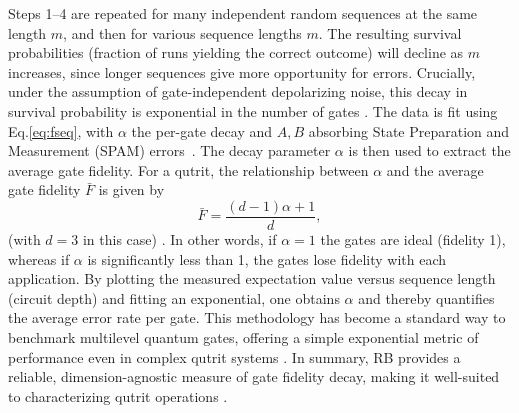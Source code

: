 Steps 1–4 are repeated for many independent random sequences at the same length $m$, and then for various sequence lengths $m$. The resulting survival probabilities (fraction of runs yielding the correct outcome) will decline as $m$ increases, since longer sequences give more opportunity for errors. Crucially, under the assumption of gate-independent depolarizing noise, this decay in survival probability is exponential in the number of gates \cite{Magesan2011PRL}. The data is fit using Eq.\eqref{eq:fseq}, with $\alpha$ the per-gate decay and $A,B$ absorbing State Preparation and Measurement (SPAM) errors~\cite{Magesan2011PRL,Magesan2012PRA}.
 The decay parameter $\alpha$ is then used to extract the average gate fidelity. For a qutrit, the relationship between $\alpha$ and the average gate fidelity $\bar{F}$ is given by
\begin{equation}
\bar{F} = \frac{(d-1)\alpha + 1}{d},
\label{eq:fbar}
\end{equation}
(with $d=3$ in this case) \cite{Nielsen2002,Magesan2012PRA}. In other words, if $\alpha=1$ the gates are ideal (fidelity 1), whereas if $\alpha$ is significantly less than 1, the gates lose fidelity with each application. By plotting the measured expectation value versus sequence length (circuit depth) and fitting an exponential, one obtains $\alpha$ and thereby quantifies the average error rate per gate. This methodology has become a standard way to benchmark multilevel quantum gates, offering a simple exponential metric of performance even in complex qutrit systems \cite{Morvan2021,Proctor2019DRB}. In summary, RB provides a reliable, dimension-agnostic measure of gate fidelity decay, making it well-suited to characterizing qutrit operations \cite{Magesan2011PRL,Magesan2012PRA}.